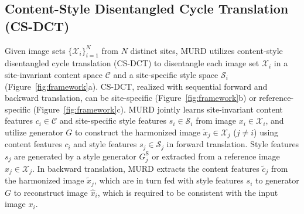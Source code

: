 \documentclass{nature}
\begin{document}
\begin{methods}
\subsection{Content-Style Disentangled Cycle Translation (CS-DCT)}
Given image sets $\{\mathcal{X}_i\}_{i=1}^N$ from $N$ distinct sites, MURD utilizes content-style disentangled cycle translation (CS-DCT) to disentangle each image set $\mathcal{X}_i$ in a site-invariant content space $\mathcal{C}$ and a site-specific style space $\mathcal{S}_i$ (Figure~\ref{fig:framework}a).
CS-DCT, realized with sequential forward and backward translation, can be site-specific (Figure~\ref{fig:framework}b) or reference-specific (Figure~\ref{fig:framework}c).
MURD jointly learns site-invariant content features $c_i\in\mathcal{C}$ and site-specific style features $s_i\in\mathcal{S}_i$ from image $x_i\in\mathcal{X}_i$, and utilize generator $G$ to construct the harmonized image $\tilde{x}_{j}\in\mathcal{X}_{j}$ ($j\neq i$) using content features $c_i$ and style features $s_{j}\in\mathcal{S}_j$ in forward translation.
Style features $s_j$ are generated by a style generator $G^{\text{S}}_j$ or extracted from a reference image $x_j\in\mathcal{X}_j$. In backward translation, MURD extracts the content features $\tilde{c}_{j}$ from the harmonized image $\tilde{x}_{j}$, which are in turn fed with style features $s_i$ to generator $G$ to reconstruct image $\hat{x}_i$, which is required to be consistent with the input image $x_i$.


\end{methods}
\end{document}
